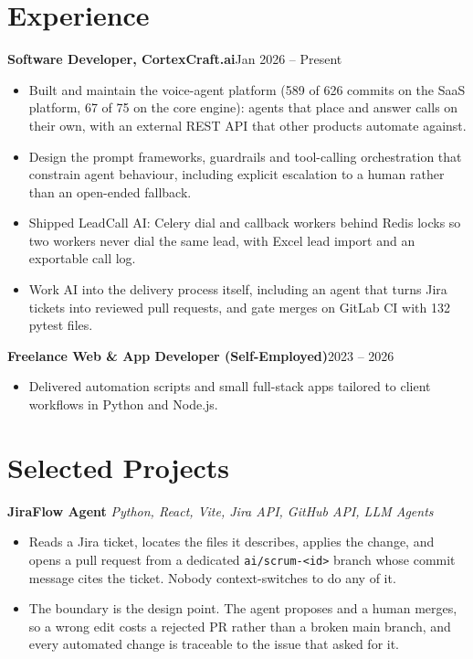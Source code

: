 \documentclass[10pt,a4paper]{article}
\newcommand{\entry}[2]{\textbf{#1}\hfill{#2}\par}
\begin{document}
\section{Experience}
\entry{Software Developer, CortexCraft.ai}{Jan 2026 -- Present}
\begin{itemize}
  \item Built and maintain the voice-agent platform (589 of 626 commits on the SaaS platform, 67 of 75
        on the core engine): agents that place and answer calls on their own, with an external REST
        API that other products automate against.
  \item Design the prompt frameworks, guardrails and tool-calling orchestration that constrain agent
        behaviour, including explicit escalation to a human rather than an open-ended fallback.
  \item Shipped LeadCall AI: Celery dial and callback workers behind Redis locks so two workers never
        dial the same lead, with Excel lead import and an exportable call log.
  \item Work AI into the delivery process itself, including an agent that turns Jira tickets into
        reviewed pull requests, and gate merges on GitLab CI with 132 pytest files.
\end{itemize}

\vspace{1pt}
\entry{Freelance Web \& App Developer (Self-Employed)}{2023 -- 2026}
\begin{itemize}
  \item Delivered automation scripts and small full-stack apps tailored to client workflows in Python and Node.js.
\end{itemize}

\section{Selected Projects}
\textbf{JiraFlow Agent} \textit{Python, React, Vite, Jira API, GitHub API, LLM Agents}
\begin{itemize}
  \item Reads a Jira ticket, locates the files it describes, applies the change, and opens a pull
        request from a dedicated \texttt{ai/scrum-<id>} branch whose commit message cites the
        ticket. Nobody context-switches to do any of it.
  \item The boundary is the design point. The agent proposes and a human merges, so a wrong edit
        costs a rejected PR rather than a broken main branch, and every automated change is traceable
        to the issue that asked for it.
\end{itemize}
\end{document}

